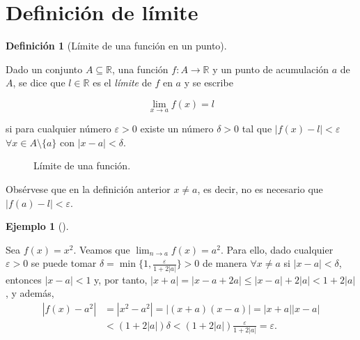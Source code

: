 \documentclass[
  a4paper,
]{scrreport}
\theoremstyle{definition}
\newtheorem{example}{Ejemplo}[chapter]
\theoremstyle{plain}
\theoremstyle{definition}
\newtheorem{definition}{Definición}[chapter]
\theoremstyle{definition}
\theoremstyle{plain}
\theoremstyle{plain}
\theoremstyle{remark}
\begin{document}
\section{Definición de límite}\label{definiciuxf3n-de-luxedmite}

\begin{definition}[Límite de una función en un
punto]\protect\hypertarget{def-limite-funcion}{}\label{def-limite-funcion}

Dado un conjunto \(A\subseteq \mathbb{R}\), una función
\(f:A\to \mathbb{R}\) y un punto de acumulación \(a\) de \(A\), se dice
que \(l\in\mathbb{R}\) es el \emph{límite} de \(f\) en \(a\) y se
escribe

\[\lim_{x\to a} f(x) = l\]

si para cualquier número \(\varepsilon>0\) existe un número \(\delta>0\)
tal que \(|f(x)-l|<\varepsilon\) \(\forall x\in A\setminus\{a\}\) con
\(|x-a|<\delta\).

\end{definition}

\begin{figure}
\centering

\caption{Límite de una función.}
\end{figure}

\begin{tcolorbox}[enhanced jigsaw, leftrule=.75mm, colbacktitle=quarto-callout-warning-color!10!white, toprule=.15mm, opacityback=0, opacitybacktitle=0.6, toptitle=1mm, breakable, bottomtitle=1mm, colframe=quarto-callout-warning-color-frame, rightrule=.15mm, titlerule=0mm, title=\textcolor{quarto-callout-warning-color}{\faExclamationTriangle}\hspace{0.5em}{Advertencia}, arc=.35mm, left=2mm, bottomrule=.15mm, colback=white, coltitle=black]

Obsérvese que en la definición anterior \(x\neq a\), es decir, no es
necesario que \(|f(a)-l|<\varepsilon\).

\end{tcolorbox}

\begin{example}[]\protect\hypertarget{exm-límite-funcion}{}\label{exm-límite-funcion}

Sea \(f(x)=x^2\). Veamos que \(\lim_{n\to a}f(x)=a^2\). Para ello, dado
cualquier \(\varepsilon>0\) se puede tomar
\(\delta=\min\{1,\frac{\varepsilon}{1+2|a|}\}>0\) de manera
\(\forall x\neq a\) si \(|x-a|<\delta\), entonces \(|x-a|<1\) y, por
tanto, \(|x+a|=|x-a+2a|\leq |x-a|+2|a|<1+2|a|\), y además,
\begin{align*}
|f(x)-a^2| &= |x^2-a^2| = |(x+a)(x-a)| =|x+a||x-a| \\ 
&< (1+2|a|)\delta < (1+2|a|)\frac{\varepsilon}{1+2|a|} = \varepsilon.
\end{align*}

\end{example}
\end{document}
